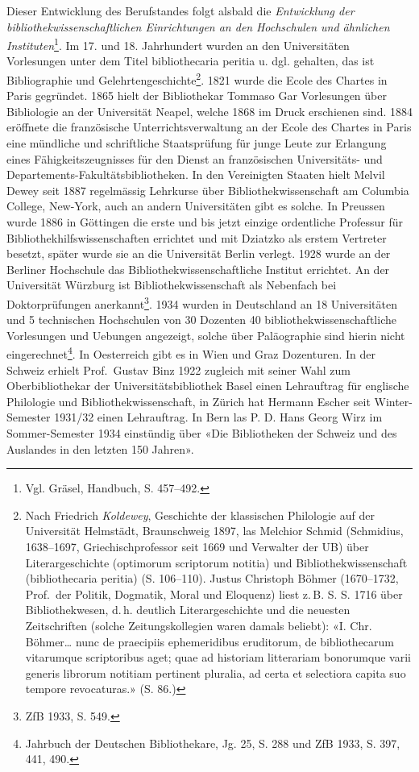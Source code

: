 \documentclass[a4paper,
fontsize=11pt,
oneside,
numbers=noperiodatend,
parskip=half-,
bibliography=totoc,
final
]{scrartcl}
\begin{document}
Dieser Entwicklung des Berufstandes folgt alsbald die \emph{Entwicklung
der bibliothekwissenschaftlichen Einrichtungen an den} \emph{Hochschulen
und ähnlichen Instituten}\footnote{Vgl. Gräsel, Handbuch, S. 457--492.}.
Im 17. und 18. Jahrhundert wurden an den Universitäten Vorlesungen unter
dem Titel bibliothecaria peritia u. dgl. gehalten, das ist Bibliographie
und Gelehrtengeschichte\footnote{Nach Friedrich \emph{Koldewey},
  Geschichte der klassischen Philologie auf der Universität Helmstädt,
  Braunschweig 1897, las Melchior Schmid (Schmidius, 1638--1697,
  Griechischprofessor seit 1669 und Verwalter der UB) über
  Literargeschichte (optimorum scriptorum notitia) und
  Bibliothekwissenschaft (bibliothecaria peritia) (S. 106--110). Justus
  Christoph Böhmer (1670--1732, Prof.~der Politik, Dogmatik, Moral und
  Eloquenz) liest z.\,B. S. S. 1716 über Bibliothekwesen, d.\,h.
  deutlich Literargeschichte und die neuesten Zeitschriften (solche
  Zeitungskollegien waren damals beliebt): «I. Chr. Böhmer\ldots{} nunc
  de praecipiis ephemeridibus eruditorum, de bibliothecarum vitarumque
  scriptoribus aget; quae ad historiam litterariam bonorumque varii
  generis librorum notitiam pertinent pluralia, ad certa et selectiora
  capita suo tempore revocaturas.» (S. 86.)}. 1821 wurde die Ecole des
Chartes in Paris gegründet. 1865 hielt der Bibliothekar Tommaso Gar
Vorlesungen über Bibliologie an der Universität Neapel, welche 1868 im
Druck erschienen sind. 1884 eröffnete die französische
Unterrichtsverwaltung an der Ecole des Chartes in Paris eine mündliche
und schriftliche Staatsprüfung für junge Leute zur Erlangung eines
Fähigkeitszeugnisses für den Dienst an französischen Universitäts- und
Departements-Fakultätsbibliotheken. In den Vereinigten Staaten hielt
Melvil Dewey seit 1887 regelmässig Lehrkurse über Bibliothekwissenschaft
am Columbia College, New-York, auch an andern Universitäten gibt es
solche. In Preussen wurde 1886 in Göttingen die erste und bis jetzt
einzige ordentliche Professur für Bibliothekhilfswissenschaften
errichtet und mit Dziatzko als erstem Vertreter besetzt, später wurde
sie an die Universität Berlin verlegt. 1928 wurde an der Berliner
Hochschule das Bibliothekwissenschaftliche Institut errichtet. An der
Universität Würzburg ist Bibliothekwissenschaft als Nebenfach bei
Doktorprüfungen anerkannt\footnote{ZfB 1933, S. 549.}. 1934 wurden in
Deutschland an 18 Universitäten und 5 technischen Hochschulen von 30
Dozenten 40 bibliothekwissenschaftliche Vorlesungen und Uebungen
angezeigt, solche über Paläographie sind hierin nicht
eingerechnet\footnote{Jahrbuch der Deutschen Bibliothekare, Jg. 25, S.
  288 und ZfB 1933, S. 397, 441, 490.}. In Oesterreich gibt es in Wien
und Graz Dozenturen. In der Schweiz erhielt Prof.~Gustav Binz 1922
zugleich mit seiner Wahl zum Oberbibliothekar der Universitätsbibliothek
Basel einen Lehrauftrag für englische Philologie und
Bibliothekwissenschaft, in Zürich hat Hermann Escher seit
Winter-Semester 1931/32 einen Lehrauftrag. In Bern las P. D. Hans Georg
Wirz im Sommer-Semester 1934 einstündig über «Die Bibliotheken der
Schweiz und des Auslandes in den letzten 150 Jahren».
\end{document}
